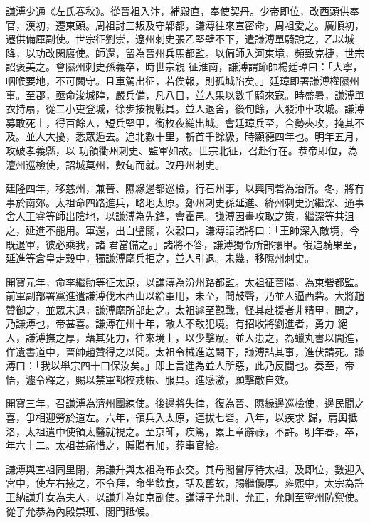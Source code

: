 \begin{pinyinscope}
 謙溥少通《左氏春秋》。從晉祖入汴，補殿直，奉使契丹。少帝即位，改西頭供奉官，漢初，遷東頭。周祖討三叛及守鄴都，謙溥往來宣密命，周祖愛之。廣順初，遷供備庫副使。世宗征劉崇，遼州刺史張乙堅壁不下，遣謙溥單騎說之，乙以城降，以功改閑廄使。師還，留為晉州兵馬都監。以偏師入河東境，頻致克捷，世宗詔褒美之。會隰州刺史孫義卒，時世宗親
 征淮南，謙溥謂節帥楊廷璋曰：「大寧，咽喉要地，不可闕守。且車駕出征，若俟報，則孤城陷矣。」廷璋即署謙溥權隰州事。至郡，亟命浚城隍，嚴兵備，凡八日，並人果以數千騎來寇。時盛暑，謙溥單衣持扇，從二小吏登城，徐步按視戰具。並人退舍，後旬餘，大發沖車攻城。謙溥募敢死士，得百餘人，短兵堅甲，銜枚夜縋出城。會廷璋兵至，合勢夾攻，掩其不及。並人大擾，悉眾遁去。追北數十里，斬首千餘級，時顯德四年也。明年五月，攻破孝義縣，以
 功領衢州刺史、監軍如故。世宗北征，召赴行在。恭帝即位，為澶州巡檢使，詔城莫州，數旬而就。改丹州刺史。



 建隆四年，移慈州，兼晉、隰緣邊都巡檢，行石州事，以興同砦為治所。冬，將有事於南郊。太祖命四路進兵，略地太原。鄭州刺史孫延進、絳州刺史沉繼深、通事舍人王睿等師出陰地，以謙溥為先鋒，會霍邑。謙溥因畫攻取之策，繼深等共沮之，延進不能用。軍還，出白璧關，次穀口，謙溥語諸將曰：「王師深入敵境，今既退軍，彼必乘我，諸
 君當備之。」諸將不答，謙溥獨令所部擐甲。俄追騎果至，延進等倉皇走穀中，獨謙溥麾兵拒之，並人引退。未幾，移隰州刺史。



 開寶元年，命李繼勛等征太原，以謙溥為汾州路都監。太祖征晉陽，為東砦都監。前軍副部署黨進遣謙溥伐木西山以給軍用，未至，聞鼓聲，乃並人逼西砦。大將趙贊御之，並眾未退，謙溥麾所部赴之。太祖遽至觀戰，怪其赴援者非精甲，問之，乃謙溥也，帝甚喜。謙溥在州十年，敵人不敢犯境。有招收將劉進者，勇力
 絕人，謙溥撫之厚，藉其死力，往來境上，以少擊眾。並人患之，為蠟丸書以間進，佯遺書道中，晉帥趙贊得之以聞。太祖令械進送闕下，謙溥詰其事，進伏請死。謙溥曰：「我以舉宗四十口保汝矣。」即上言進為並人所惡，此乃反間也。奏至，帝悟，遽令釋之，賜以禁軍都校戎帳、服具。進感激，願擊敵自效。



 開寶三年，召謙溥為濟州團練使。後邊將失律，復為晉、隰緣邊巡檢使，邊民聞之喜，爭相迎勞於道左。六年，領兵入太原，連拔七砦。八年，以疾求
 歸，肩輿抵洛，太祖遣中使領太醫就視之。至京師，疾篤，累上章辭祿，不許。明年春，卒，年六十二。太祖甚痛惜之，賻贈有加，葬事官給。



 謙溥與宣祖同里閉，弟謙升與太祖為布衣交。其母閻嘗厚待太祖，及即位，數迎入宮中，使左右掖之，不令拜，命坐飲食，話及舊故，賜繼優厚。雍熙中，太宗為許王納謙升女為夫人，以謙升為如京副使。謙溥子允則、允正，允則至寧州防禦使。從子允恭為內殿崇班、閣門祗候。




\end{pinyinscope}
